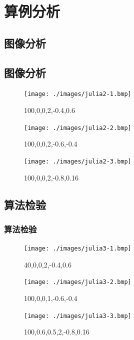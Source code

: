 \documentclass[8pt,c,compress,UTF8]{ctexbeamer}
\begin{document}
\section{算例分析}
\subsection{图像分析}
\begin{frame} 
\subsection{图像分析}
\begin{figure}[htbp]
\centering
\begin{minipage}{0.33\linewidth}
\centering
\texttt{[image: ./images/julia2-1.bmp]}
\caption{100,0,0,2,-0.4,0.6}
\label{fig2-1}
\end{minipage}\hfill
\begin{minipage}{0.33\linewidth}
\centering
\texttt{[image: ./images/julia2-2.bmp]}
\caption{100,0,0,2,-0.6,-0.4}
\label{fig2-2}
\end{minipage}\hfill
\begin{minipage}{0.33\linewidth}
\centering
\texttt{[image: ./images/julia2-3.bmp]}
\caption{100,0,0,2,-0.8,0.16}
\label{fig2-3}
\end{minipage}
\end{figure}

\end{frame}

\subsection{算法检验}
\begin{frame} 
\frametitle{算法检验}

\begin{figure}[htbp]
\centering
\begin{minipage}{0.33\linewidth}
\centering
\texttt{[image: ./images/julia3-1.bmp]}
\caption{40,0,0,2,-0.4,0.6}
\label{fig3-1}
\end{minipage}\hfill
\begin{minipage}{0.33\linewidth}
\centering
\texttt{[image: ./images/julia3-2.bmp]}
\caption{100,0,0,1,-0.6,-0.4}
\label{fig3-2}
\end{minipage}\hfill
\begin{minipage}{0.33\linewidth}
\centering
\texttt{[image: ./images/julia3-3.bmp]}
\caption{100,0.6,0.5,2,-0.8,0.16}
\label{fig3-3}
\end{minipage}
\end{figure}

\end{frame}
\end{document}
